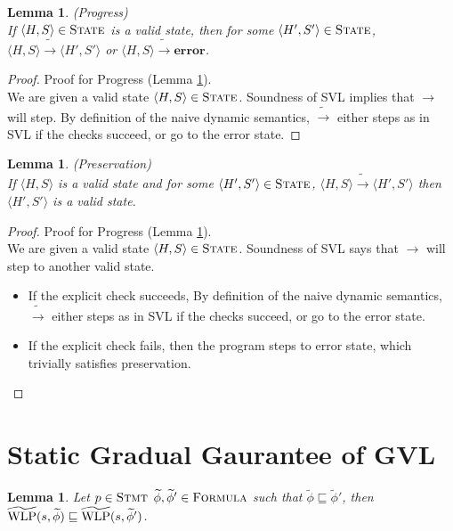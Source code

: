 \documentclass {article}
\newtheorem{lemma}[theorem]{Lemma}
\newcommand{\tphi}{\widetilde{\phi}}
\newcommand{\twlp}[2]{\widetilde{\textup{WLP}}(#1,#2)}
\begin{document}
\begin{lemma} (Progress)\\
\label{lemma_progress}
If $\langle H, S \rangle \in \textsc{State}$ is a valid state, then for some $\langle H', S' \rangle \in \textsc{State}$, $\langle H, S \rangle \widetilde{\longrightarrow} \langle H', S' \rangle$ or $\langle H, S \rangle \widetilde{\longrightarrow} \textbf{error}$. 
\end{lemma}
\begin{proof} Proof for Progress (Lemma \ref{lemma_progress}). \\
We are given a valid state $\langle H,S\rangle \in \textsc{State}$. Soundness of SVL implies that $\longrightarrow$ will step. By definition of the naive dynamic semantics, $\widetilde{\longrightarrow}$ either steps as in SVL if the checks succeed, or go to the error state. 
\end{proof}

\begin{lemma} (Preservation)\\
\label{lemma_preservation}
If $\langle H, S \rangle$ is a valid state and for some $\langle H', S' \rangle \in \textsc{State}$, $\langle H, S \rangle \widetilde{\longrightarrow} \langle H', S' \rangle$ then $\langle H', S' \rangle$ is a valid state.
\end{lemma}

\begin{proof} Proof for Progress (Lemma \ref{lemma_preservation}). \\
We are given a valid state $\langle H,S\rangle \in \textsc{State}$. Soundness of SVL says that $\longrightarrow$ will step to another valid state.\\
\begin{itemize}
	\item If the explicit check succeeds, By definition of the naive dynamic semantics, $\widetilde{\longrightarrow}$ either steps as in SVL if the checks succeed, or go to the error state. 
	\item If the explicit check fails, then the program steps to error state, which trivially satisfies preservation. 

\end{itemize}
\end{proof}

\section{Static Gradual Gaurantee of GVL}
\begin{lemma}
\label{lemma_wlp_precision}
Let $p \in \textsc{Stmt}$ $\tphi, \tphi' \in \textsc{Formula}$ such that $\tphi \sqsubseteq \tphi'$, then $\twlp{s}{\tphi} \sqsubseteq \twlp{s}{\tphi'}$.
\end{lemma}
\end{document}
